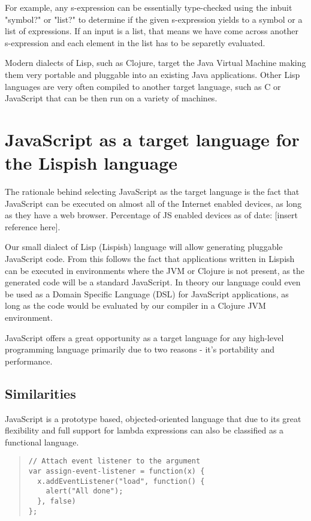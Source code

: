 For example, any s-expression can be essentially type-checked using the inbuit "symbol?" or "list?" to determine if the given s-expression yields to a symbol or a list of expressions. If an input is a list, that means we have come across another s-expression and each element in the list has to be separetly evaluated.

Modern dialects of Lisp, such as Clojure, target the Java Virtual Machine making them very portable and pluggable into an existing Java applications.
Other Lisp languages are very often compiled to another target language, such as C or JavaScript that can be then run on a variety of machines.

\section{JavaScript as a target language for the Lispish language}
The rationale behind selecting JavaScript as the target language is the fact that JavaScript can be executed on almost all of the Internet enabled devices, as long as they have a web browser. Percentage of JS enabled devices as of date: [insert reference here].

Our small dialect of Lisp (Lispish) language will allow generating pluggable JavaScript code.
From this follows the fact that applications written in Lispish can be executed in environments where the JVM or Clojure is not present, as the generated code will be a standard JavaScript.
In theory our language could even be used as a Domain Specific Language (DSL) for JavaScript applications, as long as the code would be evaluated by our compiler in a Clojure JVM environment.

JavaScript offers a great opportunity as a target language for any high-level programming language primarily due to two reasons - it's portability and performance.

\subsection{Similarities}
JavaScript is a prototype based, objected-oriented language that due to its great flexibility and full support for lambda expressions can also be classified as a functional language.
\begin{quote}
\begin{verbatim}
// Attach event listener to the argument
var assign-event-listener = function(x) {
  x.addEventListener("load", function() {
    alert("All done");
  }, false)
};
\end{verbatim}
\end{quote}


